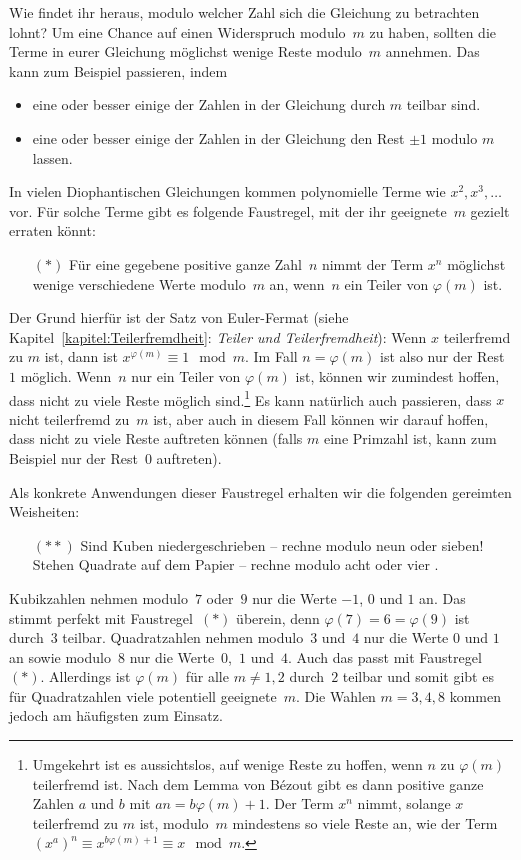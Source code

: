 Wie findet ihr heraus, modulo welcher Zahl sich die Gleichung zu betrachten lohnt? Um eine Chance auf einen Widerspruch modulo~$m$ zu haben, sollten die Terme in eurer Gleichung möglichst wenige Reste modulo~$m$ annehmen. Das kann zum Beispiel passieren, indem
\begin{itemize}
	\item eine oder besser einige der Zahlen in der Gleichung durch $m$ teilbar sind.
	\item eine oder besser einige der Zahlen in der Gleichung den Rest $\pm1$ modulo $m$ lassen.
\end{itemize}
In vielen Diophantischen Gleichungen kommen polynomielle Terme wie $x^2,x^3,\dotsc$ vor. Für solche Terme gibt es folgende Faustregel, mit der ihr geeignete~$m$ gezielt erraten könnt:
\begin{itemize}\itshape
	\item[$(*)$] Für eine gegebene positive ganze Zahl~$n$ nimmt der Term $x^n$ möglichst wenige verschiedene Werte modulo~$m$ an, wenn~$n$ ein Teiler von $\varphi(m)$ ist.
\end{itemize}
Der Grund hierfür ist der Satz von Euler-Fermat (siehe Kapitel~\ref{kapitel:Teilerfremdheit}: \emph{Teiler und Teilerfremdheit}): Wenn $x$ teilerfremd zu $m$ ist, dann ist $x^{\varphi(m)}\equiv 1\mod m$. Im Fall $n=\varphi(m)$ ist also nur der Rest~$1$ möglich. Wenn~$n$ nur ein Teiler von $\varphi(m)$ ist, können wir zumindest hoffen, dass nicht zu viele Reste möglich sind.\footnote{Umgekehrt ist es aussichtslos, auf wenige Reste zu hoffen, wenn $n$ zu $\varphi(m)$ teilerfremd ist. Nach dem Lemma von Bézout gibt es dann positive ganze Zahlen $a$ und $b$ mit $an=b\varphi(m)+1$. Der Term $x^n$ nimmt, solange $x$ teilerfremd zu $m$ ist, modulo~$m$ mindestens so viele Reste an, wie der Term $(x^a)^n\equiv x^{b\varphi(m)+1}\equiv x\mod m$.} Es kann natürlich auch passieren, dass $x$ nicht teilerfremd zu~$m$ ist, aber auch in diesem Fall können wir darauf hoffen, dass nicht zu viele Reste auftreten können (falls $m$ eine Primzahl ist, kann zum Beispiel nur der Rest~$0$ auftreten).

Als konkrete Anwendungen dieser Faustregel erhalten wir die folgenden gereimten Weisheiten:
\begin{itemize}\itshape
	\item[$(**)$] Sind Kuben niedergeschrieben -- rechne modulo neun oder sieben!\\
	Stehen Quadrate auf dem Papier -- rechne modulo acht oder vier .
\end{itemize}
Kubikzahlen nehmen modulo~$7$ oder~$9$ nur die Werte $-1$, $0$ und $1$ an. Das stimmt perfekt mit Faustregel~$(*)$ überein, denn $\varphi(7)=6=\varphi(9)$ ist durch~$3$ teilbar. Quadratzahlen nehmen modulo~$3$ und~$4$ nur die Werte $0$ und $1$ an sowie modulo~$8$ nur die Werte~$0$,~$1$ und~$4$. Auch das passt mit Faustregel~$(*)$. Allerdings ist $\varphi(m)$ für alle $m\neq 1,2$ durch~$2$ teilbar und somit gibt es für Quadratzahlen viele potentiell geeignete~$m$. Die Wahlen $m=3,4,8$ kommen jedoch am häufigsten zum Einsatz.

